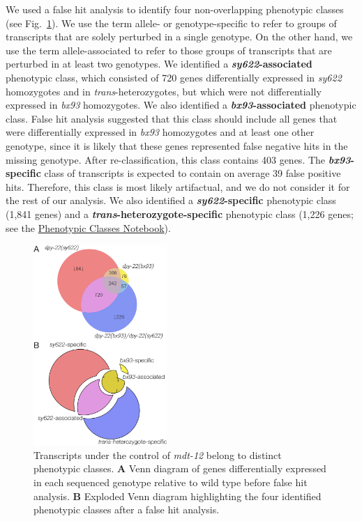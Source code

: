 \documentclass[10pt, twocolumn]{article}
\newcommand{\gene}[1]{\mbox{\emph{#1}}}
\newcommand{\dpy}{\gene{mdt-12}}
\begin{document}
We used a false hit analysis to identify four non-overlapping phenotypic
classes (see Fig.~\ref{fig:venn}). We use the term allele- or genotype-specific
to refer to groups of transcripts that are solely perturbed in a single
genotype. On the other hand, we use the term allele-associated to refer to those
groups of transcripts that are perturbed in at least two genotypes. We
identified a \textbf{\emph{sy622}-associated} phenotypic class, which consisted
of 720 genes differentially expressed in \emph{sy622} homozygotes and in
\emph{trans}-heterozygotes, but which were not differentially expressed in
\emph{bx93} homozygotes. We also identified a \textbf{\emph{bx93}-associated}
phenotypic class. False hit analysis suggested that this class should include all
genes that were differentially expressed in \emph{bx93} homozygotes and at least
one other genotype, since it is likely that these genes represented false
negative hits in the missing genotype. After re-classification, this class
contains 403 genes. The \textbf{\emph{bx93}-specific} class of transcripts is
expected to contain on average 39 false positive hits. Therefore, this class is
most likely artifactual, and we do not consider it for the rest of our analysis.
We also identified a \textbf{\emph{sy622}-specific} phenotypic class (1,841
genes) and a \textbf{\emph{trans}-heterozygote-specific} phenotypic class (1,226
genes; see the
\href{https://wormlabcaltech.github.io/med-cafe/notebook/phenotypic_classes.html}{
Phenotypic Classes Notebook}).


\begin{figure}
  \centering{}
  \includegraphics[width=0.45\textwidth]{../figs/venn_diagrams.pdf}
  \caption{
  Transcripts under the control of \dpy{} belong to distinct phenotypic
  classes.
  \textbf{A} Venn diagram of genes differentially expressed in each sequenced
  genotype relative to wild type before false hit analysis.
  \textbf{B} Exploded Venn diagram highlighting the four identified phenotypic
  classes after a false hit analysis.
  }
\label{fig:venn}
\end{figure}
\end{document}

